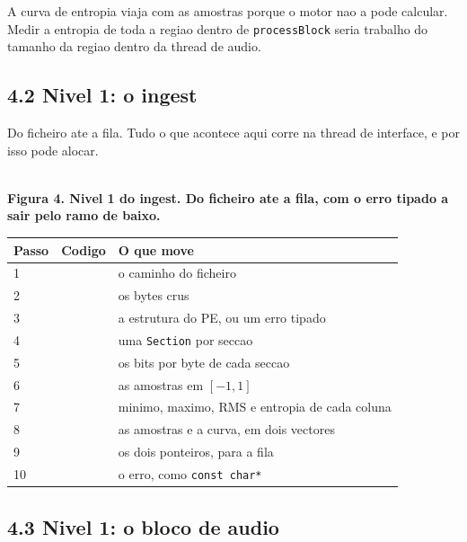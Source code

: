\documentclass[11pt,a4paper,landscape]{article}
\newcommand{\figura}[2]{%
  \sbox{\figbox}{}%
  \pgfmathsetmacro{\atlasw}{\the\wd\figbox}%
  \pgfmathsetmacro{\atlasalt}{\the\ht\figbox + \the\dp\figbox}%
  \pgfmathsetmacro{\atlaslin}{\the\linewidth}%
  \pgfmathsetmacro{\atlask}{min(\atlaslin/\atlasw, 432.00168/\atlasalt)}%
  \pgfmathsetmacro{\atlasnw}{\atlasw*\atlask}%
  \begin{center}%
  \resizebox{\atlasnw pt}{!}{\usebox{\figbox}}\\[5pt]
  {\footnotesize\bfseries #2}%
  \end{center}%
}
\begin{document}
A curva de entropia viaja com as amostras porque o motor nao a pode calcular.
Medir a entropia de toda a regiao dentro de \texttt{processBlock} seria
trabalho do tamanho da regiao dentro da thread de audio.

\subsection*{4.2 Nivel 1: o ingest}

Do ficheiro ate a fila. Tudo o que acontece aqui corre na thread de
interface, e por isso pode alocar.

\figura{dataflow-l1-ingest}{Figura 4. Nivel 1 do ingest. Do ficheiro ate a fila, com o erro tipado a sair pelo ramo de baixo.}

\begin{center}
\begin{tabular}{@{}L{1.4cm}L{7.0cm}L{16.6cm}@{}}
\toprule
{}
\textbf{Passo} & \textbf{Codigo} & \textbf{O que move} \\
 &  & o caminho do ficheiro \\
2 &  & os bytes crus \\
3 &  & a estrutura do PE, ou um erro tipado \\
4 &  & uma \texttt{Section} por seccao \\
5 &  & os bits por byte de cada seccao \\
6 &  & as amostras em $[-1, 1]$ \\
7 &  & minimo, maximo, RMS e entropia de cada coluna \\
8 &  & as amostras e a curva, em dois vectores \\
9 &  & os dois ponteiros, para a fila \\
10 &  & o erro, como \texttt{const char*} \\
\bottomrule
\end{tabular}
\end{center}

\subsection*{4.3 Nivel 1: o bloco de audio}
\end{document}
